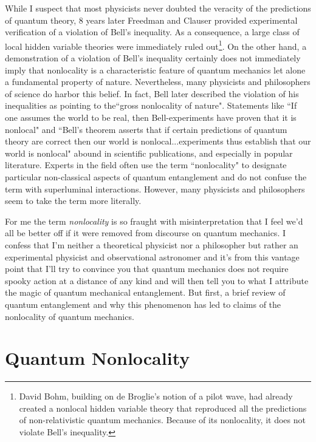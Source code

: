 \documentclass[12pt]{article}
\begin{document}
While I suspect that most physicists never doubted the veracity of the predictions of quantum theory, 8 years later Freedman and Clauser\cite{Fre72} provided experimental verification of a violation of Bell's inequality. As a consequence, a large class of local hidden variable theories were immediately ruled out\footnote{David Bohm, building on de Broglie's notion of a pilot wave, had already created a nonlocal hidden variable theory\cite{Boh52} that reproduced all the predictions of non-relativistic quantum mechanics. Because of its nonlocality, it does not violate Bell's inequality.}. On the other hand, a demonstration of a violation of Bell's inequality certainly does not immediately imply that nonlocality is a characteristic feature of quantum mechanics let alone a fundamental property of nature. Nevertheless, many physicists and philosophers of science do harbor this belief. In fact, Bell later described the violation of his inequalities as pointing to the``gross nonlocality of nature"\cite{Bel75}.  Statements like ``If one assumes the world to be real, then Bell-experiments have proven that it is nonlocal"\cite{Wis06} and ``Bell's theorem asserts that if certain predictions of quantum theory are correct then our world is nonlocal...experiments thus establish that our world is nonlocal"\cite{Gol11} abound in scientific publications, and especially in popular literature.  Experts in the field often use the term ``nonlocality" to designate particular non-classical aspects of quantum entanglement and do not confuse the term with superluminal interactions. However, many physicists and philosophers seem to take the term more literally. 

For me the term {\it nonlocality} is so fraught with misinterpretation that I feel we'd all be better off if it were removed from discourse on quantum mechanics. I confess that I'm neither a theoretical physicist nor a philosopher but rather an experimental physicist and observational astronomer and it's from this vantage point that I'll try to convince you that quantum mechanics does not require spooky action at a distance of any kind and will then tell you to what I attribute the magic of quantum mechanical entanglement. But first, a brief review of quantum entanglement and why this phenomenon has led to claims of the nonlocality of quantum mechanics.

\section{Quantum Nonlocality}
\end{document}
